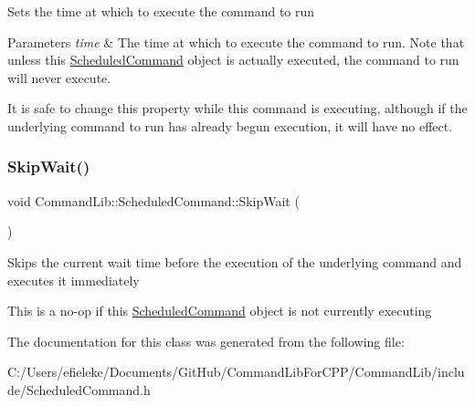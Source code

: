 Sets the time at which to execute the command to run


\begin{DoxyParams}{Parameters}
{\em time} & The time at which to execute the command to run. Note that unless this \mbox{\hyperlink{class_command_lib_1_1_scheduled_command}{Scheduled\+Command}} object is actually executed, the command to run will never execute. \\
\hline
\end{DoxyParams}


It is safe to change this property while this command is executing, although if the underlying command to run has already begun execution, it will have no effect. \mbox{\label{class_command_lib_1_1_scheduled_command_a4437a8661c9617790a032376d650e482}} 
\subsubsection{\texorpdfstring{Skip\+Wait()}{SkipWait()}}
{\footnotesize\ttfamily void Command\+Lib\+::\+Scheduled\+Command\+::\+Skip\+Wait (\begin{DoxyParamCaption}{ }\end{DoxyParamCaption})}



Skips the current wait time before the execution of the underlying command and executes it immediately

This is a no-\/op if this \mbox{\hyperlink{class_command_lib_1_1_scheduled_command}{Scheduled\+Command}} object is not currently executing

The documentation for this class was generated from the following file\+:\begin{DoxyCompactItemize}
\item 
C\+:/\+Users/efieleke/\+Documents/\+Git\+Hub/\+Command\+Lib\+For\+C\+P\+P/\+Command\+Lib/include/Scheduled\+Command.\+h\end{DoxyCompactItemize}

